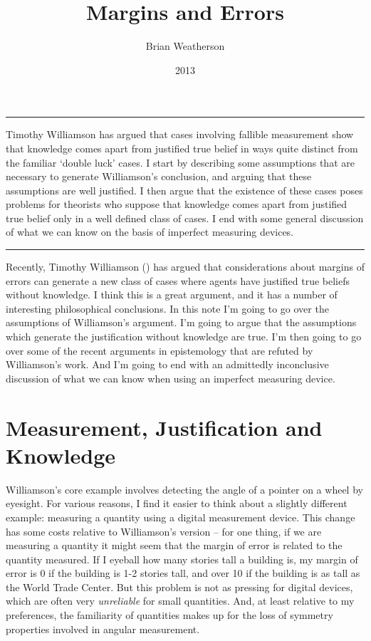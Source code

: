 \documentclass[
  10pt,
  letterpaper,
  DIV=11,
  numbers=noendperiod,
  twoside]{scrartcl}
\title{Margins and Errors}
\author{Brian Weatherson}
\date{2013}
\renewenvironment{abstract}
 {\vspace{-1.25cm}
 \quotation\small\noindent\rule{\linewidth}{.5pt}\par\smallskip
 \noindent }
 {\par\noindent\rule{\linewidth}{.5pt}\endquotation}
\begin{document}
\maketitle
\begin{abstract}
Timothy Williamson has argued that cases involving fallible measurement
show that knowledge comes apart from justified true belief in ways quite
distinct from the familiar `double luck' cases. I start by describing
some assumptions that are necessary to generate Williamson's conclusion,
and arguing that these assumptions are well justified. I then argue that
the existence of these cases poses problems for theorists who suppose
that knowledge comes apart from justified true belief only in a well
defined class of cases. I end with some general discussion of what we
can know on the basis of imperfect measuring devices.
\end{abstract}

Recently, Timothy Williamson ()
has argued that considerations about margins of errors can generate a
new class of cases where agents have justified true beliefs without
knowledge. I think this is a great argument, and it has a number of
interesting philosophical conclusions. In this note I'm going to go over
the assumptions of Williamson's argument. I'm going to argue that the
assumptions which generate the justification without knowledge are true.
I'm then going to go over some of the recent arguments in epistemology
that are refuted by Williamson's work. And I'm going to end with an
admittedly inconclusive discussion of what we can know when using an
imperfect measuring device.

\section{Measurement, Justification and
Knowledge}\label{measurement-justification-and-knowledge}

Williamson's core example involves detecting the angle of a pointer on a
wheel by eyesight. For various reasons, I find it easier to think about
a slightly different example: measuring a quantity using a digital
measurement device. This change has some costs relative to Williamson's
version -- for one thing, if we are measuring a quantity it might seem
that the margin of error is related to the quantity measured. If I
eyeball how many stories tall a building is, my margin of error is 0 if
the building is 1-2 stories tall, and over 10 if the building is as tall
as the World Trade Center. But this problem is not as pressing for
digital devices, which are often very \emph{unreliable} for small
quantities. And, at least relative to my preferences, the familiarity of
quantities makes up for the loss of symmetry properties involved in
angular measurement.
\end{document}
